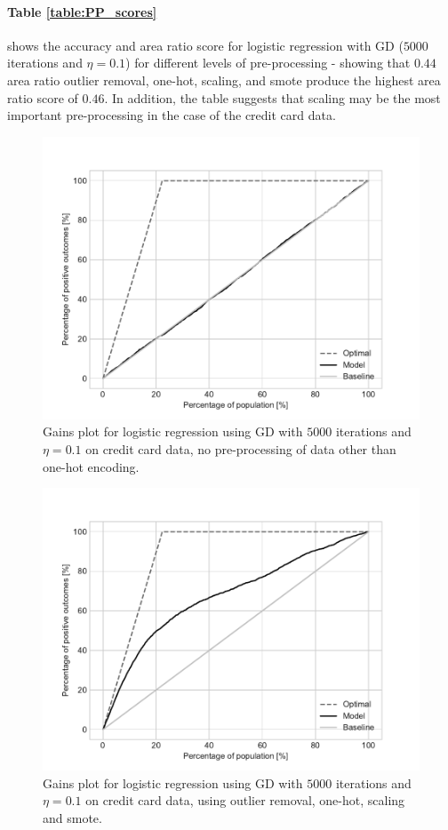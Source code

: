 \documentclass[%
oneside,                 %
final,                   %
10pt]{article}
\begin{document}
\paragraph{Table \ref{table:PP_scores}} shows the accuracy and area ratio score for logistic regression with GD ($5000$ iterations and $\eta=0.1$) for different levels of pre-processing - showing that $0.44$ area ratio outlier removal, one-hot, scaling, and smote produce the highest area ratio score of $0.46$. In addition, the table suggests that scaling may be the most important pre-processing in the case of the credit card data. 
\begin{figure}[!h]
        \centering 
         \includegraphics[scale=0.5]{../Results/CC_logreg_no_pp/gains_gd.pdf} 
        \caption{Gains plot for logistic regression using GD with $5000$ iterations and $\eta=0.1$ on credit card data, no pre-processing of data other than one-hot encoding. }
        \label{fig:logreg_no_pp}   
\end{figure}  

\begin{figure}[!h]
        \centering 
         \includegraphics[scale=0.5]{../Results/CC_logreg_scaling_smote/gains_gd.pdf} 
        \caption{Gains plot for logistic regression using GD with $5000$ iterations and $\eta=0.1$ on credit card data, using outlier removal, one-hot, scaling and smote. }
        \label{fig:logreg_best_pp}   
\end{figure}  
\end{document}

